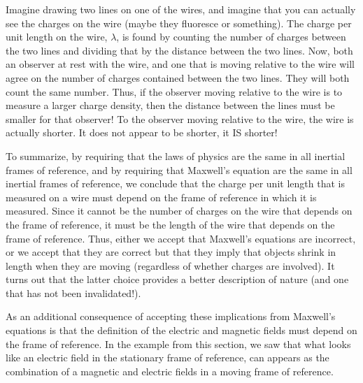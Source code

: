Imagine drawing two lines on one of the wires, and imagine that you can actually see the  charges on the wire (maybe they fluoresce or something). The charge per unit length on the wire, $\lambda$, is found by counting the number of charges between the two lines and dividing that by the distance between the two lines. Now, both an observer at rest with the wire, and one that is moving relative to the wire will agree on the number of charges contained between the two lines. They will both count the same number. Thus, if the observer moving relative to the wire is to measure a larger charge density, then the distance between the lines must be smaller for that observer! To the observer moving relative to the wire, the wire is actually shorter. It does not appear to be shorter, it IS shorter!

To summarize, by requiring that the laws of physics are the same in all inertial frames of reference, and by requiring that Maxwell's equation are the same in all inertial frames of reference, we conclude that the charge per unit length that is measured on a wire must depend on the frame of reference in which it is measured. Since it cannot be the number of charges on the wire that depends on the frame of reference, it must be the length of the wire that depends on the frame of reference. Thus, either we accept that Maxwell's equations are incorrect, or we accept that they are correct but that they imply that objects shrink in length when they are moving (regardless of whether charges are involved). It turns out that the latter choice provides a better description of nature (and one that has not been invalidated!). 

As an additional consequence of accepting these implications from Maxwell's equations is that the definition of the electric and magnetic fields must depend on the frame of reference. In the example from this section, we saw that what looks like an electric field in the stationary frame of reference, can appears as the combination of a magnetic and electric fields in a moving frame of reference.

